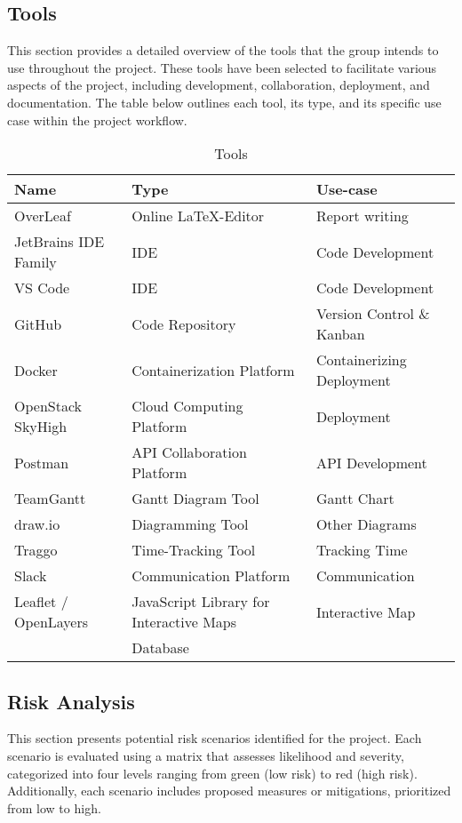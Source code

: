 \subsection{Tools}\label{sec:tools}
This section provides a detailed overview of the tools that the group intends to use throughout the project. These tools have been selected to facilitate various aspects of the project, including development, collaboration, deployment, and documentation. The table below outlines each tool, its type, and its specific use case within the project workflow.
\begin{table} [H]
    \centering
    \begin{tabular}{|l|l|l|}
    \hline
    Name & Type & Use-case \\
    \hline
    OverLeaf & Online \LaTeX-Editor & Report writing \\
    JetBrains IDE Family & IDE & Code Development \\
    VS Code & IDE & Code Development \\
    GitHub & Code Repository & Version Control \& Kanban \\
    Docker & Containerization Platform & Containerizing Deployment \\
    OpenStack SkyHigh & Cloud Computing Platform & Deployment \\
    Postman & API Collaboration Platform & API Development \\
    TeamGantt & Gantt Diagram Tool & Gantt Chart \\
    draw.io & Diagramming Tool & Other Diagrams \\
    Traggo & Time-Tracking Tool & Tracking Time \\
    Slack & Communication Platform & Communication \\
    Leaflet / OpenLayers & JavaScript Library for Interactive Maps & Interactive Map  \\
     & Database & \\
    \hline
    \end{tabular}
    \caption{Tools}
    \label{tab:tools}
\end{table}

\subsection{Risk Analysis}\label{sec:risk_analysis}

This section presents potential risk scenarios identified for the project. Each scenario is evaluated using a matrix that assesses likelihood and severity, categorized into four levels ranging from green (low risk) to red (high risk). Additionally, each scenario includes proposed measures or mitigations, prioritized from low to high.

